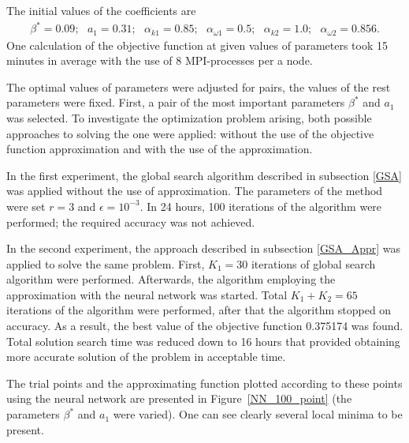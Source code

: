 \documentclass[sensors,article,submit,moreauthors,pdftex]{Definitions/mdpi}
\begin{document}
The initial values of the coefficients are
\begin{equation}
	\begin{aligned}
		\beta^* = 0.09;\ \ \ a_1 = 0.31;\ \ \ \alpha_{k 1} = 0.85;\ \ \ \alpha_{\omega 1} = 0.5; \ \ \ \alpha_{k 2} = 1.0;\ \ \ \alpha_{\omega 2} = 0.856.
	\end{aligned}
\end{equation}
One calculation of the objective function at given values of parameters took 15 minutes in average with the use of 8 MPI-processes per a node. 

The optimal values of parameters were adjusted for pairs, the values of the rest parameters were fixed. 
First, a pair of the most important parameters $\beta^*$ and $a_1$ was selected. 
To investigate the optimization problem arising, both possible approaches to solving the one were applied: without the use of the objective function approximation  and with the use of the approximation.

In the first experiment, the global search algorithm described in subsection \ref{GSA} was applied without the use of approximation. 
The parameters of the method were set $r = 3$ and $\epsilon = 10^{-3}$. 
In 24 hours, 100 iterations of the algorithm were performed; the required accuracy was not achieved. 

In the second experiment, the approach described in subsection \ref{GSA_Appr} was applied to solve the same problem.
First, $K_1 = 30$ iterations of global search algorithm were performed. 
Afterwards, the algorithm employing the approximation with the neural network was started. 
Total $K_1 + K_2 = 65$ iterations of the algorithm were performed, after that the algorithm stopped on accuracy. 
As a result, the best value  of the objective function 0.375174 was found. 
Total solution search time was reduced down to 16 hours that provided obtaining more accurate solution of the problem in acceptable time.

The trial points and the approximating function plotted according to these points using the neural network are presented in Figure~\ref{NN_100_point} (the parameters $\beta^*$ and $a_1$ were varied). One can see clearly several local minima to be present.
\end{document}
